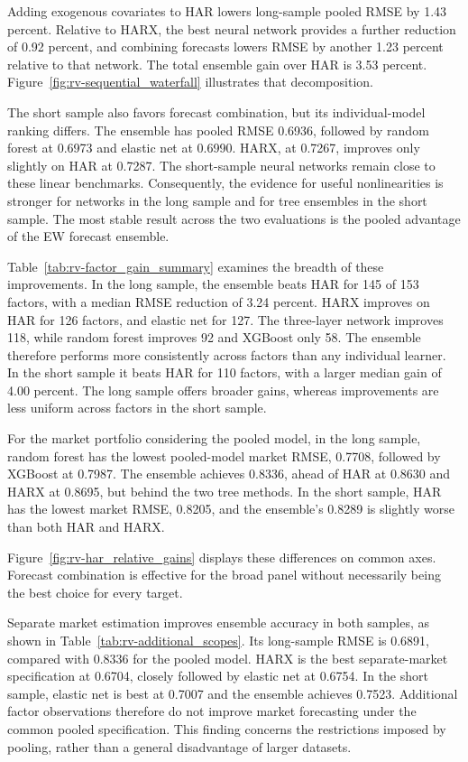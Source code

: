 \documentclass[preprint,12pt,authoryear]{elsarticle}
\begin{document}
Adding exogenous covariates to HAR lowers long-sample pooled RMSE by 1.43 percent. Relative to HARX, the best neural network provides a further reduction of 0.92 percent, and combining forecasts lowers RMSE by another 1.23 percent relative to that network. The total ensemble gain over HAR is 3.53 percent. Figure~\ref{fig:rv-sequential_waterfall} illustrates that decomposition.

The short sample also favors forecast combination, but its individual-model ranking differs. The ensemble has pooled RMSE 0.6936, followed by random forest at 0.6973 and elastic net at 0.6990. HARX, at 0.7267, improves only slightly on HAR at 0.7287. The short-sample neural networks remain close to these linear benchmarks. Consequently, the evidence for useful nonlinearities is stronger for networks in the long sample and for tree ensembles in the short sample. The most stable result across the two evaluations is the pooled advantage of the EW forecast ensemble.

Table~\ref{tab:rv-factor_gain_summary} examines the breadth of these improvements. In the long sample, the ensemble beats HAR for 145 of 153 factors, with a median RMSE reduction of 3.24 percent. HARX improves on HAR for 126 factors, and elastic net for 127. The three-layer network improves 118, while random forest improves 92 and XGBoost only 58. The ensemble therefore performs more consistently across factors than any individual learner. In the short sample it beats HAR for 110 factors, with a larger median gain of 4.00 percent. The long sample offers broader gains, whereas improvements are less uniform across factors in the short sample.

For the market portfolio considering the pooled model, in the long sample, random forest has the lowest pooled-model market RMSE, 0.7708, followed by XGBoost at 0.7987. The ensemble achieves 0.8336, ahead of HAR at 0.8630 and HARX at 0.8695, but behind the two tree methods. In the short sample, HAR has the lowest market RMSE, 0.8205, and the ensemble's 0.8289 is slightly worse than both HAR and HARX.

Figure~\ref{fig:rv-har_relative_gains} displays these differences on common axes. Forecast combination is effective for the broad panel without necessarily being the best choice for every target.

Separate market estimation improves ensemble accuracy in both samples, as shown in Table~\ref{tab:rv-additional_scopes}. Its long-sample RMSE is 0.6891, compared with 0.8336 for the pooled model. HARX is the best separate-market specification at 0.6704, closely followed by elastic net at 0.6754. In the short sample, elastic net is best at 0.7007 and the ensemble achieves 0.7523. Additional factor observations therefore do not improve market forecasting under the common pooled specification. This finding concerns the restrictions imposed by pooling, rather than a general disadvantage of larger datasets.
\end{document}
